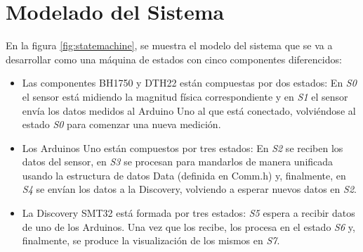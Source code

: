 \section{Modelado del Sistema}\label{sec:modelo}

En la figura \ref{fig:statemachine}, se muestra el modelo del sistema que se va a
desarrollar como una m\'aquina de estados con cinco componentes
diferencidos:

\begin{itemize}
\item Las componentes BH1750 y DTH22 est\'an compuestas por dos
  estados: En \emph{S0} el sensor est\'a midiendo la magnitud f\'isica
  correspondiente y en \emph{S1} el sensor env\'ia los datos medidos
  al Arduino Uno al que est\'a conectado, volvi\'endose al estado
  \emph{S0} para comenzar una nueva medici\'on.
\item Los Arduinos Uno est\'an compuestos por tres estados: En
  \emph{S2} se reciben los datos del sensor, en \emph{S3} se procesan
  para mandarlos de manera unificada usando la estructura de datos
  Data (definida en Comm.h) y, finalmente, en \emph{S4} se env\'ian
  los datos a la Discovery, volviendo a esperar nuevos datos en
  \emph{S2}.
\item La Discovery SMT32 est\'a formada por tres estados: \emph{S5}
  espera a recibir datos de uno de los Arduinos. Una vez que los
  recibe, los procesa en el estado \emph{S6} y, finalmente, se produce
  la visualizaci\'on de los mismos en \emph{S7}. 
\end{itemize}

